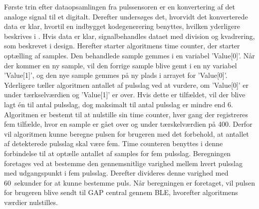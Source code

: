 Første trin efter dataopsamlingen fra pulssensoren er en konvertering af det analoge signal til et digitalt. Derefter undersøges det, hvorvidt det konverterede data er klar, hvortil en indbygget kodegenerering benyttes, hvilken yderligere beskrives i . Hvis data er klar, signalbehandles dataet med division og kvadrering, som beskrevet i design. Herefter starter algoritmens time counter, der starter optælling af samples. Den behandlede sample gemmes i en variabel 'Value[0]'. Når der kommer en ny sample, vil den forrige sample blive gemt i en ny variabel 'Value[1]', og den nye sample gemmes på ny plads i arrayet for 'Value[0]'. Yderligere tæller algoritmen antallet af pulsslag ved at vurdere, om 'Value[0]' er under tærkselværdien og 'Value[1]' er over. Hvis dette er tilfældet, vil der blive lagt én til antal pulsslag, dog maksimalt til antal pulsslag er mindre end 6. Algoritmen er bestemt til at nulstille sin time counter, hver gang der registreres fem tilfælde, hvor en sample er gået over og under tærskelværdien på 400. Derfor vil algoritmen kunne beregne pulsen for brugeren med det forbehold, at antallet af detekterede pulsslag skal være fem. Time counteren benyttes i denne forbindelse til at optælle antallet af samples for fem pulsslag. Beregningen foretages ved at bestemme den gennemsnitlige varighed mellem hvert pulsslag med udgangspunkt i fem pulsslag. Derefter divideres denne varighed med 60~sekunder for at kunne bestemme puls. Når beregningen er foretaget, vil pulsen for brugeren blive sendt til GAP central gennem BLE, hvorefter algoritmens værdier nulstilles.\\

